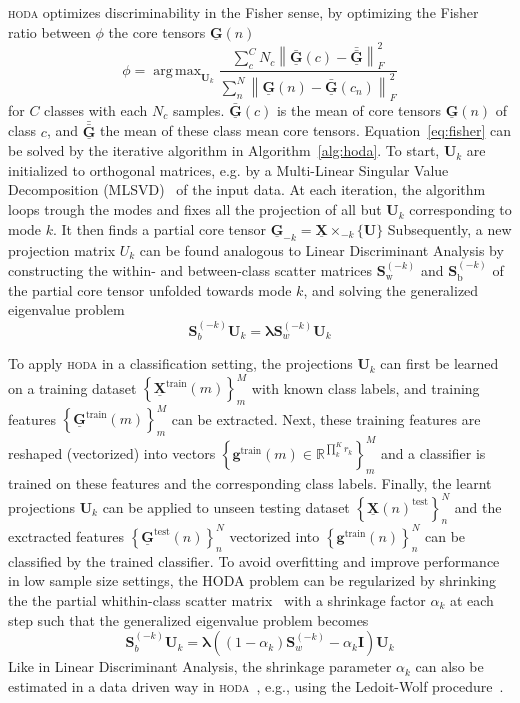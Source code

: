 \documentclass[twocolumn]{article}
\newcommand{\ten}[1]{\underline{\mathbf{#1}}} %
\newcommand{\mat}[1]{\mathbf{#1}} %
\renewcommand{\vec}[1]{\mathbf{#1}} %
\newcommand{\mmprs}[2]{\times_{-#2}\{#1\}} %
\DeclareMathOperator*{\argmax}{arg\,max}
\begin{document}
\textsc{hoda} optimizes discriminability in the Fisher sense, by optimizing the
Fisher ratio between $\phi$ the core tensors $\ten{G}(n)$
\begin{equation}
	\phi = \argmax_{\mat{U}_k}
	\frac{\sum_c^CN_c\left\lVert\bar{\ten{G}}(c)-\bar{\bar{\ten{G}}}\right\rVert_F^2}
	{\sum_n^N\left\lVert\ten{G}(n)-\bar{\ten{G}}(c_n)\right\rVert_F^2}
	\label{eq:fisher}
\end{equation}
for $C$ classes with each $N_c$ samples. $\bar{\ten{G}}(c)$ is the mean of core
tensors $\ten{G}(n)$ of class $c$, and $\bar{\bar{\ten{G}}}$ the mean of
these class mean core tensors.
Equation~\ref{eq:fisher} can be solved by the iterative algorithm in
Algorithm~\ref{alg:hoda}.
To start, $\mat{U}_k$ are initialized to orthogonal matrices, e.g. by a
Multi-Linear Singular Value Decomposition (MLSVD)~\cite{Lathauwer2000} of the input data.
At each iteration, the algorithm loops trough the modes and fixes all the
projection of all but $\mat{U}_k$ corresponding to mode $k$.
It then finds a partial core tensor $\ten{G}_{-k}=\ten{X}\mmprs{\mat{U}}{k}$
Subsequently, a new projection matrix $U_k$ can be found analogous to Linear
Discriminant Analysis by constructing the within- and between-class scatter
matrices $\mat{S}_\text{w}^{(-k)}$ and $\mat{S}_\text{b}^{(-k)}$ of the partial
core tensor unfolded towards mode $k$, and solving the generalized eigenvalue
problem
\begin{equation}
	\mat{S}_b^{(-k)}\mat{U}_k = \mat{\lambda}\mat{S}_w^{(-k)}\mat{U}_k
\end{equation}

To apply \textsc{hoda} in a classification setting, the projections $\mat{U}_k$
can first be learned on a training dataset
$\left\{\ten{X}^\text{train}(m)\right\}_m^M$ with known class labels, and
training features $\left\{\ten{G}^\text{train}(m)\right\}_m^M$ can be extracted.
Next, these training features are reshaped (vectorized) into vectors
$\left\{\vec{g}^\text{train}(m) \in \mathbb{R}^{\prod_k^Kr_k}\right\}_m^M$ and a classifier is
trained on these features and the corresponding class labels.
Finally, the learnt projections $\mat{U}_k$ can be applied to unseen testing
dataset $\left\{\ten{X}(n)^\text{test}\right\}_n^N$ and the exctracted features
$\left\{\ten{G}^\text{test}(n)\right\}_n^N$ vectorized into
$\left\{\vec{g}^\text{train}(n)\right\}_n^N$ can be
classified by the trained classifier.
To avoid overfitting and improve performance in low sample size settings, the
\textsc{HODA} problem can be regularized by shrinking the the partial
whithin-class scatter matrix~\cite{Phan2010} with a shrinkage factor
$\alpha_k$ at each step such that the generalized eigenvalue problem becomes
\begin{equation}
	\mat{S}_b^{(-k)}\mat{U}_k =
	\mat{\lambda}((1-\alpha_k)\mat{S}_w^{(-k)}-\alpha_k\mat{I})\mat{U}_k
\end{equation}
Like in Linear Discriminant Analysis, the shrinkage parameter $\alpha_k$ can
also be estimated in a data driven way in \textsc{hoda}~\cite{Jorajuria2022},
e.g., using the Ledoit-Wolf procedure~\cite{Ledoit2003}.
\end{document}
